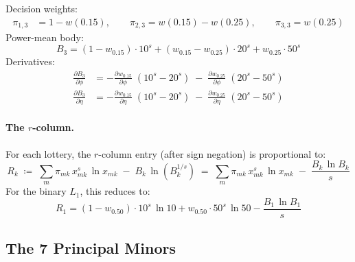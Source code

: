 \documentclass[11pt,a4paper]{article}
\theoremstyle{definition}
\begin{document}
Decision weights:
\begin{align}
    \pi_{1,3} &= 1 - w(0.15), \qquad
    \pi_{2,3} = w(0.15) - w(0.25), \qquad
    \pi_{3,3} = w(0.25)
\end{align}
Power-mean body:
\begin{equation}
    B_3 = (1 - w_{0.15})\cdot 10^s
    + (w_{0.15} - w_{0.25})\cdot 20^s
    + w_{0.25}\cdot 50^s
\end{equation}
Derivatives:
\begin{align}
    \frac{\partial B_3}{\partial\phi}
    &= -\frac{\partial w_{0.15}}{\partial\phi}\;(10^s - 20^s)
    \;-\; \frac{\partial w_{0.25}}{\partial\phi}\;(20^s - 50^s) \\[4pt]
    \frac{\partial B_3}{\partial\eta}
    &= -\frac{\partial w_{0.15}}{\partial\eta}\;(10^s - 20^s)
    \;-\; \frac{\partial w_{0.25}}{\partial\eta}\;(20^s - 50^s)
\end{align}

\paragraph{The $r$-column.}
For each lottery, the $r$-column entry (after sign negation) is
proportional to:
\begin{equation}
    \label{eq:r_col}
    R_k \;\coloneqq\;
    \sum_m \pi_{mk}\,x_{mk}^s\,\ln x_{mk}
    \;-\; B_k\,\ln(B_k^{1/s})
    \;=\;
    \sum_m \pi_{mk}\,x_{mk}^s\,\ln x_{mk}
    \;-\; \frac{B_k\,\ln B_k}{s}
\end{equation}
For the binary $L_1$, this reduces to:
\begin{equation}
    R_1 = (1 - w_{0.50})\cdot 10^s\,\ln 10
    + w_{0.50}\cdot 50^s\,\ln 50
    - \frac{B_1\,\ln B_1}{s}
\end{equation}

\subsection{The 7 Principal Minors}
\end{document}
